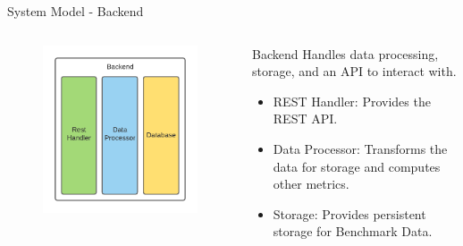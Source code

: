 \begin{frame}{System Model - Backend}
    \begin{columns}[T]
        \begin{column}{.48\textwidth}
            \begin{figure}[H]
                \includegraphics[width=\textwidth]{images/systemmodel_backend.pdf}
                \label{fig:backendmodel}
            \end{figure}
        \end{column}
        \hfill
        \begin{column}{.48\textwidth}
            \begin{block}{Backend}
                Handles data processing, storage, and an API to interact with.
            \end{block}
            \begin{itemize}
                \item<2-> REST Handler:\newline{} Provides the REST API.
                \item<3-> Data Processor:\newline{} Transforms the data for storage and computes other metrics.
                \item<4-> Storage:\newline{} Provides persistent storage for Benchmark Data.
            \end{itemize}
        \end{column}
    \end{columns}
\end{frame}


